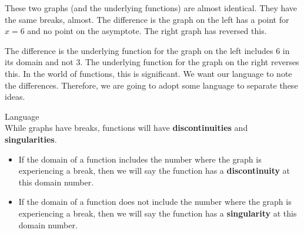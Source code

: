 \documentclass{ximera}
\begin{document}
\begin{image}
\end{image}


These two graphs (and the underlying functions) are almost identical. They have the same breaks, almost. The difference is the graph on the left has a point for $x=6$ and no point on the asymptote.  The right graph has reversed this.

The difference is the underlying function for the graph on the left includes $6$ in its domain and not $3$. The underlying function for the graph on the right reverses this. In the world of functions, this is significant.  We want our language to note the differences. Therefore, we are going to adopt some language to separate these ideas.


\begin{idea} Language \\
While graphs have breaks, functions will have \textbf{discontinuities} and \textbf{singularities}.

\begin{itemize}
\item If the domain of a function includes the number where the graph is experiencing a break, then we will say the function has a \textbf{discontinuity} at this domain number.

\item If the domain of a function does not include the number where the graph is experiencing a break, then we will say the function has a \textbf{singularity} at this domain number.
\end{itemize}

\end{idea}
\end{document}
